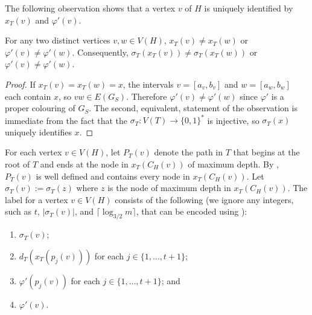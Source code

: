 \documentclass[kpfonts]{patmorin}
\begin{document}
The following observation shows that a vertex $v$ of $H$ is uniquely identified by $x_T(v)$ and $\varphi'(v)$.

\begin{obs}
    For any two distinct vertices $v,w\in V(H)$, $x_T(v)\neq x_T(w)$ or $\varphi'(v)\neq\varphi'(w)$.  Consequently, $\sigma_T(x_T(v))\neq \sigma_T(x_T(w))$ or $\varphi'(v)\neq\varphi'(w)$. 
\end{obs}

\begin{proof}
  If $x_T(v)=x_T(w)=x$, the intervals $v=[a_v,b_v]$ and $w=[a_w,b_w]$ each contain $x$, so $vw\in E(G_S)$.  Therefore $\varphi'(v)\neq\varphi'(w)$ since $\varphi'$ is a proper colouring of $G_S$.  The second, equivalent, statement of the observation is immediate from the fact that the $\sigma_T: V(T)\to\{0,1\}^*$ is injective, so $\sigma_T(x)$ uniquely identifies $x$.
\end{proof}

For each vertex $v\in V(H)$, let $P_T(v)$ denote the path in $T$ that begins at the root of $T$ and ends at the node in $x_T(C_H(v))$ of maximum depth.  By , $P_T(v)$ is well defined and contains every node in $x_T(C_H(v))$.  Let $\sigma_T(v):=\sigma_T(z)$ where $z$ is the node of maximum depth in $x_T(C_H(v))$.  The label for a vertex $v\in V(H)$ consists of the following (we ignore any integers, such as $t$, $|\sigma_T(v)|$, and $\lceil\log_{3/2} m\rceil$, that can be encoded using ):

\begin{enumerate}[(TC1)]
  \item $\sigma_T(v)$;
  \item $d_T(x_T(p_j(v)))$ for each $j\in\{1,\ldots,t+1\}$; 
  \item $\varphi'(p_j(v))$ for each $j\in\{1,\ldots,t+1\}$; and
  \item $\varphi'(v)$.
\end{enumerate}
\end{document}
